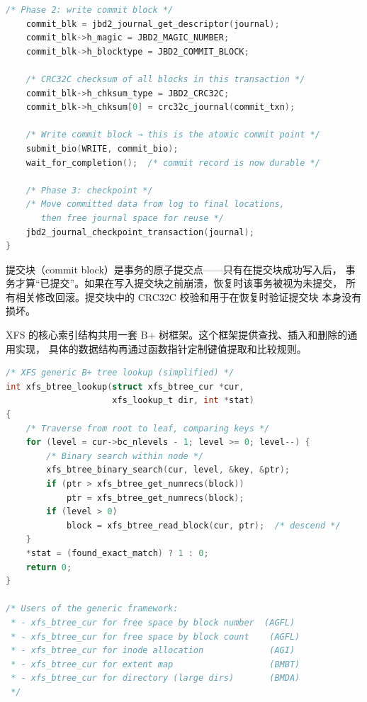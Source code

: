 \begin{filesystemlayout}
\begin{lstlisting}[language=C]
    /* Phase 2: write commit block */
    commit_blk = jbd2_journal_get_descriptor(journal);
    commit_blk->h_magic = JBD2_MAGIC_NUMBER;
    commit_blk->h_blocktype = JBD2_COMMIT_BLOCK;

    /* CRC32C checksum of all blocks in this transaction */
    commit_blk->h_chksum_type = JBD2_CRC32C;
    commit_blk->h_chksum[0] = crc32c_journal(commit_txn);

    /* Write commit block → this is the atomic commit point */
    submit_bio(WRITE, commit_bio);
    wait_for_completion();  /* commit record is now durable */

    /* Phase 3: checkpoint */
    /* Move committed data from log to final locations,
       then free journal space for reuse */
    jbd2_journal_checkpoint_transaction(journal);
}
\end{lstlisting}

提交块（commit block）是事务的原子提交点——只有在提交块成功写入后，
事务才算``已提交''。如果在写入提交块之前崩溃，恢复时该事务被视为未提交，
所有相关修改回滚。提交块中的 CRC32C 校验和用于在恢复时验证提交块
本身没有损坏。


XFS 的核心索引结构共用一套 B+ 树框架。这个框架提供查找、插入和删除的通用实现，
具体的数据结构再通过函数指针定制键值提取和比较规则。

\begin{lstlisting}[language=C]
/* XFS generic B+ tree lookup (simplified) */
int xfs_btree_lookup(struct xfs_btree_cur *cur,
                     xfs_lookup_t dir, int *stat)
{
    /* Traverse from root to leaf, comparing keys */
    for (level = cur->bc_nlevels - 1; level >= 0; level--) {
        /* Binary search within node */
        xfs_btree_binary_search(cur, level, &key, &ptr);
        if (ptr > xfs_btree_get_numrecs(block))
            ptr = xfs_btree_get_numrecs(block);
        if (level > 0)
            block = xfs_btree_read_block(cur, ptr);  /* descend */
    }
    *stat = (found_exact_match) ? 1 : 0;
    return 0;
}

/* Users of the generic framework:
 * - xfs_btree_cur for free space by block number  (AGFL)
 * - xfs_btree_cur for free space by block count    (AGFL)
 * - xfs_btree_cur for inode allocation             (AGI)
 * - xfs_btree_cur for extent map                   (BMBT)
 * - xfs_btree_cur for directory (large dirs)       (BMDA)
 */
\end{lstlisting}


\end{filesystemlayout}
